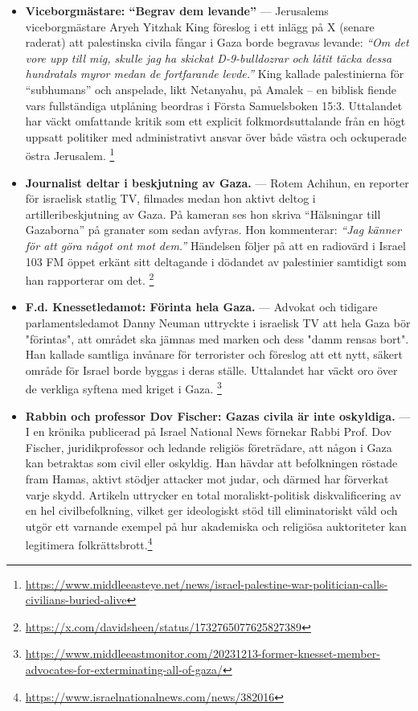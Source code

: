 \begin{itemize}
\item \textbf{Viceborgmästare: “Begrav dem levande”} — Jerusalems viceborgmästare Aryeh Yitzhak King föreslog i ett inlägg på X (senare raderat) att palestinska civila fångar i Gaza borde begravas levande: \textit{“Om det vore upp till mig, skulle jag ha skickat D-9-bulldozrar och låtit täcka dessa hundratals myror medan de fortfarande levde.”} King kallade palestinierna för “subhumans” och anspelade, likt Netanyahu, på Amalek – en biblisk fiende vars fullständiga utplåning beordras i Första Samuelsboken 15:3. Uttalandet har väckt omfattande kritik som ett explicit folkmordsuttalande från en högt uppsatt politiker med administrativt ansvar över både västra och ockuperade östra Jerusalem. \footnote{\url{https://www.middleeasteye.net/news/israel-palestine-war-politician-calls-civilians-buried-alive}}

\item \textbf{Journalist deltar i beskjutning av Gaza.} — Rotem Achihun, en reporter för israelisk statlig TV, filmades medan hon aktivt deltog i artilleribeskjutning av Gaza. På kameran ses hon skriva “Hälsningar till Gazaborna” på granater som sedan avfyras. Hon kommenterar: \textit{“Jag känner för att göra något ont mot dem.”} Händelsen följer på att en radiovärd i Israel 103 FM öppet erkänt sitt deltagande i dödandet av palestinier samtidigt som han rapporterar om det. \footnote{\url{https://x.com/davidsheen/status/1732765077625827389}}

\item \textbf{F.d. Knessetledamot: Förinta hela Gaza.} — Advokat och tidigare parlamentsledamot Danny Neuman uttryckte i israelisk TV att hela Gaza bör "förintas", att området ska jämnas med marken och dess "damm rensas bort". Han kallade samtliga invånare för terrorister och föreslog att ett nytt, säkert område för Israel borde byggas i deras ställe. Uttalandet har väckt oro över de verkliga syftena med kriget i Gaza. \footnote{\url{https://www.middleeastmonitor.com/20231213-former-knesset-member-advocates-for-exterminating-all-of-gaza/}}

\item \textbf{Rabbin och professor Dov Fischer: Gazas civila är inte oskyldiga.} — I en krönika publicerad på Israel National News förnekar Rabbi Prof. Dov Fischer, juridikprofessor och ledande religiös företrädare, att någon i Gaza kan betraktas som civil eller oskyldig. Han hävdar att befolkningen röstade fram Hamas, aktivt stödjer attacker mot judar, och därmed har förverkat varje skydd. Artikeln uttrycker en total moraliskt-politisk diskvalificering av en hel civilbefolkning, vilket ger ideologiskt stöd till eliminatoriskt våld och utgör ett varnande exempel på hur akademiska och religiösa auktoriteter kan legitimera folkrättsbrott.\footnote{\url{https://www.israelnationalnews.com/news/382016}}


\end{itemize}
